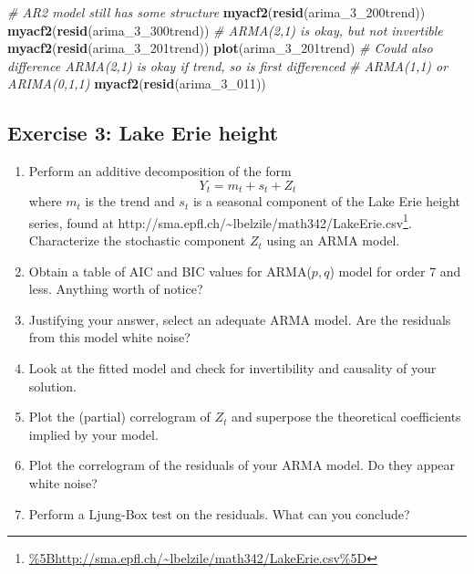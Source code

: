 \documentclass[]{book}
\newenvironment{Shaded}{\begin{snugshade}}{\end{snugshade}}
\newcommand{\CommentTok}[1]{\textcolor[rgb]{0.56,0.35,0.01}{\textit{#1}}}
\newcommand{\DecValTok}[1]{\textcolor[rgb]{0.00,0.00,0.81}{#1}}
\newcommand{\KeywordTok}[1]{\textcolor[rgb]{0.13,0.29,0.53}{\textbf{#1}}}
\newcommand{\NormalTok}[1]{#1}
\providecommand{\tightlist}{%
  \setlength{\itemsep}{0pt}\setlength{\parskip}{0pt}}
\let\rmarkdownfootnote\footnote%
\def\footnote{\protect\rmarkdownfootnote}
\renewcommand{\href}[2]{#2\footnote{\url{#1}}}
\begin{document}
\begin{Shaded}
\begin{Highlighting}[]
\CommentTok{# AR2 model still has some structure}
\KeywordTok{myacf2}\NormalTok{(}\KeywordTok{resid}\NormalTok{(arima_}\DecValTok{3}\NormalTok{_200trend))}
\KeywordTok{myacf2}\NormalTok{(}\KeywordTok{resid}\NormalTok{(arima_}\DecValTok{3}\NormalTok{_300trend))}
\CommentTok{# ARMA(2,1) is okay, but not invertible}
\KeywordTok{myacf2}\NormalTok{(}\KeywordTok{resid}\NormalTok{(arima_}\DecValTok{3}\NormalTok{_201trend))}
\KeywordTok{plot}\NormalTok{(arima_}\DecValTok{3}\NormalTok{_201trend)}
\CommentTok{# Could also difference ARMA(2,1) is okay if trend, so is first differenced}
\CommentTok{# ARMA(1,1) or ARIMA(0,1,1)}
\KeywordTok{myacf2}\NormalTok{(}\KeywordTok{resid}\NormalTok{(arima_}\DecValTok{3}\NormalTok{_}\DecValTok{011}\NormalTok{))}
\end{Highlighting}
\end{Shaded}

\hypertarget{exercise-3-lake-erie-height-1}{%
\subsection{Exercise 3: Lake Erie height}\label{exercise-3-lake-erie-height-1}}

\begin{enumerate}
\def\labelenumi{\arabic{enumi}.}
\tightlist
\item
  Perform an additive decomposition of the form
  \[Y_t = m_t + s_t + Z_t\] where \(m_t\) is the trend and \(s_t\) is a seasonal component of the Lake Erie height series, found at \href{\%5Bhttp://sma.epfl.ch/~lbelzile/math342/LakeErie.csv\%5D}{http://sma.epfl.ch/\textasciitilde{}lbelzile/math342/LakeErie.csv}. Characterize the stochastic component \(Z_t\) using an ARMA model.
\item
  Obtain a table of AIC and BIC values for ARMA(\(p, q\)) model for order 7 and less. Anything worth of notice?
\item
  Justifying your answer, select an adequate ARMA model. Are the residuals from this model white noise?
\item
  Look at the fitted model and check for invertibility and causality of your solution.
\item
  Plot the (partial) correlogram of \(Z_t\) and superpose the theoretical coefficients implied by your model.
\item
  Plot the correlogram of the residuals of your ARMA model. Do they appear white noise?
\item
  Perform a Ljung-Box test on the residuals. What can you conclude?
\end{enumerate}
\end{document}
